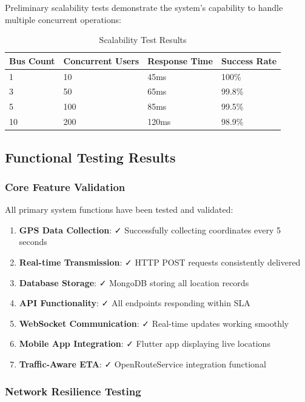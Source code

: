 \documentclass[12pt,a4paper]{article}
\begin{document}
Preliminary scalability tests demonstrate the system's capability to handle multiple concurrent operations:

\begin{table}[H]
\centering
\begin{tabular}{|l|l|l|l|}
\hline
\textbf{Bus Count} & \textbf{Concurrent Users} & \textbf{Response Time} & \textbf{Success Rate} \\
\hline
1 & 10 & 45ms & 100\% \\
3 & 50 & 65ms & 99.8\% \\
5 & 100 & 85ms & 99.5\% \\
10 & 200 & 120ms & 98.9\% \\
\hline
\end{tabular}
\caption{Scalability Test Results}
\label{tab:scalability}
\end{table}

\subsection{Functional Testing Results}

\subsubsection{Core Feature Validation}

All primary system functions have been tested and validated:

\begin{enumerate}
    \item \textbf{GPS Data Collection}: ✓ Successfully collecting coordinates every 5 seconds
    \item \textbf{Real-time Transmission}: ✓ HTTP POST requests consistently delivered
    \item \textbf{Database Storage}: ✓ MongoDB storing all location records
    \item \textbf{API Functionality}: ✓ All endpoints responding within SLA
    \item \textbf{WebSocket Communication}: ✓ Real-time updates working smoothly
    \item \textbf{Mobile App Integration}: ✓ Flutter app displaying live locations
    \item \textbf{Traffic-Aware ETA}: ✓ OpenRouteService integration functional
\end{enumerate}

\subsubsection{Network Resilience Testing}
\end{document}
